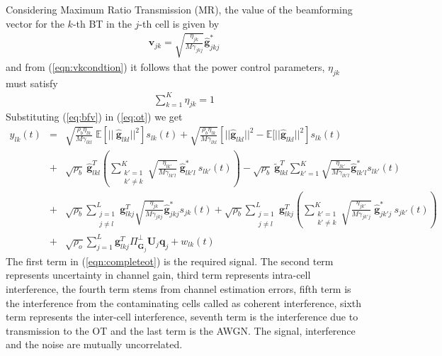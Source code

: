 \documentclass[10pt, a4paper, twoside,fleqn]{article}
\begin{document}
 Considering Maximum Ratio Transmission (MR), the value of the beamforming vector for the $k$-th BT in the $j$-th cell is given by
\begin{eqnarray}\label{eq:bfv}
	\pmb{v}_{jk} = \sqrt{\frac{\eta_{jk}}{M\gamma_{jkj}}}\pmb{\hat g}^*_{jkj}
\end{eqnarray}
and from (\ref{eqn:vkcondtion}) it follows that the power control parameters, $\eta_{jk}$ must satisfy
\begin{eqnarray}\label{eqn:etaconstraint}
\sum\limits_{k=1}^{K}\eta_{jk}=1
\end{eqnarray}
Substituting (\ref{eq:bfv}) in (\ref{eq:ot}) we get
\begin{eqnarray} \label{eqn:completeot}
	y_{lk}(t)  &=& \sqrt{\frac{\rho_b\eta_{lk}}{M\gamma_{lkl}}} \ \mathbb{E}[|| \ \pmb{\hat g}_{lkl}||^2]s_{lk}(t)
	           +  \sqrt{\frac{\rho_b\eta_{lk}}{M\gamma_{lkl}}}\left[||\pmb{\hat g}_{lkl}||^2 - \mathbb{E}[||\pmb{\hat g}_{lkl}||^2\right]s_{lk}(t)  \nonumber \\
	           &+& \sqrt{\rho_b} \ \pmb{\hat g}_{lkl}^T \left(\sum_{\substack{k'=1 \\ k' \neq k}}^{K} \sqrt{\frac{\eta_{lk'}}{M\gamma_{lk'l}}} \ \pmb{\hat g}^*_{lk'l} \ s_{lk'} (t)\right)
	           - \sqrt{\rho_b}\ \pmb{\widetilde g}^T_{lkl}\sum\limits_{k'=1}^{K}\sqrt{\frac{\eta_{lk'}}{M\gamma_{lk'l}}}\pmb{\hat g}^*_{lk'l}s_{lk'}(t) \nonumber \\
	           &+& \sqrt{\rho_b}\sum\limits_{\substack{j=1 \\ j\neq l}}^{L}\pmb{g}^T_{lkj}\sqrt{\frac{\eta_{jk}}{M\gamma_{jkj}}}\pmb{\hat g}^*_{jkj}s_{jk}(t)
               + \sqrt{\rho_b} \sum_{\substack{j=1 \\ j \neq l}}^{L} \pmb{g}_{lkj}^T \left(\sum_{\substack{k'=1 \\ k' \neq k}}^{K} \sqrt{\frac{\eta_{jk'}}{M\gamma_{jk'j}}} \ \pmb{\hat g}^*_{jk'j} \ s_{jk'} (t)\right)
               \nonumber \\
               &+& \sqrt{\rho_o}\sum_{j=1}^{L}\pmb{g}^T_{lkj} \Pi^{\perp}_{\pmb{\hat{G}}_j} \pmb{U}_j \pmb{q}_{j}
               + w_{lk}(t)      
\end{eqnarray}
The first term in (\ref{eqn:completeot}) is the required signal. The second term represents uncertainty in channel gain, third term represents intra-cell interference, the fourth term stems from channel estimation errors, fifth term is the  interference from the contaminating cells called as coherent interference, sixth term represents the inter-cell interference, seventh term is the interference due to transmission to the OT and the last term is the AWGN. The signal, interference and the noise are mutually uncorrelated.
\end{document}
